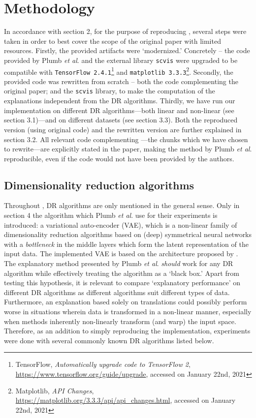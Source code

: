 \section{Methodology}
In accordance with section 2, for the purpose of reproducing \citep{plumb2020explaining}, several steps were taken in order to best cover the scope of the original paper with limited resources. Firstly, the provided artifacts were `modernized.' Concretely -- the code provided by Plumb \textit{et al}. and the external library \texttt{scvis} were upgraded to be compatible with \texttt{TensorFlow 2.4.1}\footnote{TensorFlow, \textit{Automatically upgrade code to TensorFlow 2}, \url{https://www.tensorflow.org/guide/upgrade}, accessed on January 22nd, 2021} and \texttt{matplotlib 3.3.3}\footnote{Matplotlib, \textit{API Changes}, \url{https://matplotlib.org/3.3.3/api/api_changes.html}, accessed on January 22nd, 2021}. Secondly, the provided code was rewritten from scratch -- both the code complementing the original paper; and the \texttt{scvis} library, to make the computation of the explanations independent from the DR algorithms. Thirdly, we have run our implementation on different DR algorithms---both linear and non-linear (see section 3.1)---and on different datasets (see section 3.3). Both the reproduced version (using original code) and the rewritten version are further explained in section 3.2. All relevant code complementing \cite{plumb2020explaining}---the chunks which we have chosen to rewrite---are explicitly stated in the paper, making the method by Plumb \textit{et al}. reproducible, even if the code would not have been provided by the authors. 

\subsection{Dimensionality reduction algorithms}
Throughout \cite{plumb2020explaining}, DR algorithms are only mentioned in the general sense. Only in section 4 the algorithm which Plumb \textit{et al}. use for their experiments is introduced: a variational auto-encoder (VAE), which is a non-linear family of dimensionality reduction algorithms based on (deep) symmetrical neural networks with a \textit{bottleneck} in the middle layers which form the latent representation of the input data. The implemented VAE is based on the architecture proposed by \cite{ding2018interpretable}.\\

The explanatory method presented by Plumb \textit{et al}. \textit{should} work for any DR algorithm while effectively treating the algorithm as a `black box.' Apart from testing this hypothesis, it is relevant to compare `explanatory performance' on different DR algorithms as different algorithms suit different types of data. Furthermore, an explanation based solely on translations could possibly perform worse in situations wherein data is transformed in a non-linear manner, especially when methods inherently non-linearly transform (and warp) the input space. Therefore, as an addition to simply reproducing the implementation, experiments were done with several commonly known DR algorithms listed below.

